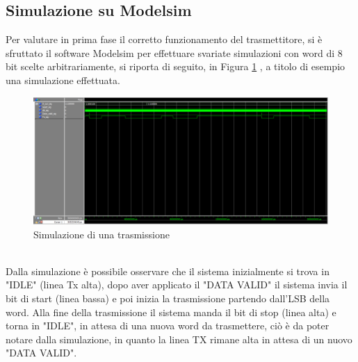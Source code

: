 \documentclass[a4paper, titlepage]{article}
\begin{document}
\subsection{Simulazione su Modelsim}
Per valutare in prima fase il corretto funzionamento del trasmettitore, si è sfruttato il software Modelsim per effettuare svariate simulazioni con word di 8 bit scelte arbitrariamente, si riporta di seguito, in Figura \ref{fig:testTx} , a titolo di esempio una simulazione effettuata. 
\begin{figure}[h]
    \centering
    \includegraphics[scale=0.4]{test_TX_modelsim.PNG}
    \caption{Simulazione di una trasmissione}
    \label{fig:testTx}
\end{figure}\\
\noindent Dalla simulazione è possibile osservare che il sistema inizialmente si trova in "IDLE" (linea Tx alta), dopo aver applicato il "DATA \textunderscore VALID" il sistema invia il bit di start (linea bassa) e poi inizia la trasmissione partendo dall'LSB della word. Alla fine della trasmissione il sistema manda il bit di stop (linea alta) e torna in "IDLE", in attesa di una nuova word da trasmettere, ciò è da poter notare dalla simulazione, in quanto la linea TX rimane alta in attesa di un nuovo "DATA \textunderscore VALID".
\newpage
\end{document}
